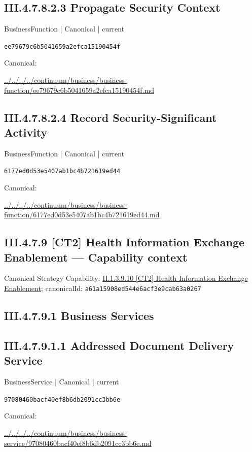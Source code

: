 \documentclass[10pt,a4paper]{article}
\begin{document}
\subsection*{III.4.7.8.2.3 Propagate Security Context}
\label{element-ee79679c6b5041659a2efca15190454f}
{\small BusinessFunction | Canonical | current}\par
\texttt{ee79679c6b5041659a2efca15190454f}\par
Canonical: \par
{\footnotesize\url{../../../../continuum/business/business-function/ee79679c6b5041659a2efca15190454f.md}}\par
\subsection*{III.4.7.8.2.4 Record Security-Significant Activity}
\label{element-6177ed0d53e5407ab1bc4b721619ed44}
{\small BusinessFunction | Canonical | current}\par
\texttt{6177ed0d53e5407ab1bc4b721619ed44}\par
Canonical: \par
{\footnotesize\url{../../../../continuum/business/business-function/6177ed0d53e5407ab1bc4b721619ed44.md}}\par
\subsection*{III.4.7.9 [CT2] Health Information Exchange Enablement — Capability context}
Canonical Strategy Capability: \hyperref[element-a61a15908ed544e6acf3e9cab63a0267]{II.1.3.9.10 [CT2] Health Information Exchange Enablement}; canonicalId: \texttt{a61a15908ed544e6acf3e9cab63a0267}\par
\subsection*{III.4.7.9.1 Business Services}
\subsection*{III.4.7.9.1.1 Addressed Document Delivery Service}
\label{element-97080460bacf40ef8b6db2091cc3bb6e}
{\small BusinessService | Canonical | current}\par
\texttt{97080460bacf40ef8b6db2091cc3bb6e}\par
Canonical: \par
{\footnotesize\url{../../../../continuum/business/business-service/97080460bacf40ef8b6db2091cc3bb6e.md}}\par
\end{document}
